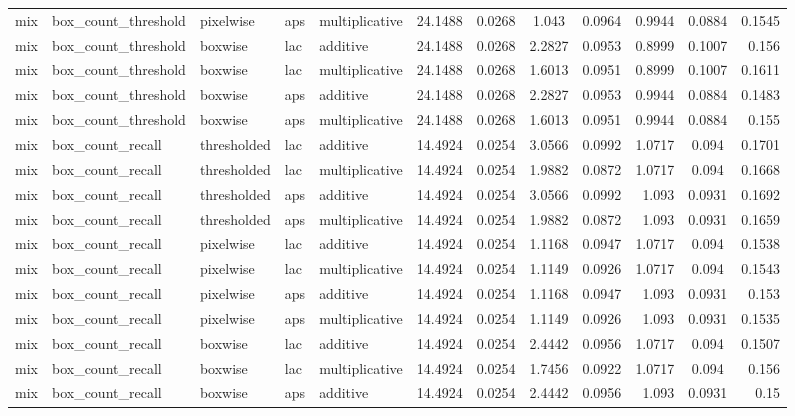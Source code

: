 \begin{table*}[htbp]
\begin{tabular}{@{}lllll rrcrrcr@{}}
mix & box\_count\_threshold & pixelwise & aps & multiplicative & 24.1488 & 0.0268 & 1.043 & 0.0964 & 0.9944 & 0.0884 & 0.1545 \\
mix & box\_count\_threshold & boxwise & lac & additive & 24.1488 & 0.0268 & 2.2827 & 0.0953 & 0.8999 & 0.1007 & 0.156 \\
mix & box\_count\_threshold & boxwise & lac & multiplicative & 24.1488 & 0.0268 & 1.6013 & 0.0951 & 0.8999 & 0.1007 & 0.1611 \\
mix & box\_count\_threshold & boxwise & aps & additive & 24.1488 & 0.0268 & 2.2827 & 0.0953 & 0.9944 & 0.0884 & 0.1483 \\
mix & box\_count\_threshold & boxwise & aps & multiplicative & 24.1488 & 0.0268 & 1.6013 & 0.0951 & 0.9944 & 0.0884 & 0.155 \\
mix & box\_count\_recall & thresholded & lac & additive & 14.4924 & 0.0254 & 3.0566 & 0.0992 & 1.0717 & 0.094 & 0.1701 \\
mix & box\_count\_recall & thresholded & lac & multiplicative & 14.4924 & 0.0254 & 1.9882 & 0.0872 & 1.0717 & 0.094 & 0.1668 \\
mix & box\_count\_recall & thresholded & aps & additive & 14.4924 & 0.0254 & 3.0566 & 0.0992 & 1.093 & 0.0931 & 0.1692 \\
mix & box\_count\_recall & thresholded & aps & multiplicative & 14.4924 & 0.0254 & 1.9882 & 0.0872 & 1.093 & 0.0931 & 0.1659 \\
mix & box\_count\_recall & pixelwise & lac & additive & 14.4924 & 0.0254 & 1.1168 & 0.0947 & 1.0717 & 0.094 & 0.1538 \\
mix & box\_count\_recall & pixelwise & lac & multiplicative & 14.4924 & 0.0254 & 1.1149 & 0.0926 & 1.0717 & 0.094 & 0.1543 \\
mix & box\_count\_recall & pixelwise & aps & additive & 14.4924 & 0.0254 & 1.1168 & 0.0947 & 1.093 & 0.0931 & 0.153 \\
mix & box\_count\_recall & pixelwise & aps & multiplicative & 14.4924 & 0.0254 & 1.1149 & 0.0926 & 1.093 & 0.0931 & 0.1535 \\
mix & box\_count\_recall & boxwise & lac & additive & 14.4924 & 0.0254 & 2.4442 & 0.0956 & 1.0717 & 0.094 & 0.1507 \\
mix & box\_count\_recall & boxwise & lac & multiplicative & 14.4924 & 0.0254 & 1.7456 & 0.0922 & 1.0717 & 0.094 & 0.156 \\
mix & box\_count\_recall & boxwise & aps & additive & 14.4924 & 0.0254 & 2.4442 & 0.0956 & 1.093 & 0.0931 & 0.15 \\

\end{tabular}
\end{table*}
